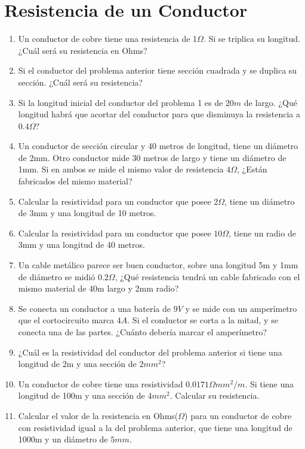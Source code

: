 \documentclass[../main]{subfiles}
\begin{document}
\chapter{Resistencia de un Conductor}


\begin{enumerate}
    \item Un conductor de cobre tiene una resistencia de 1$\Omega$. Si se triplica su longitud.  ¿Cuál será su resistencia en Ohms?
    \item Si el conductor del problema anterior tiene sección cuadrada y  se duplica su sección.  ¿Cuál será su resistencia?
    \item Si la longitud inicial del conductor del problema 1 es de $20m$ de largo.  ¿Qué longitud habrá que acortar del conductor para que disminuya la resistencia a $0.4\Omega$?
    \item Un conductor de sección circular y 40 metros de longitud, tiene un diámetro de 2mm. Otro conductor mide 30 metros de largo y tiene un diámetro de 1mm. Si en ambos se mide el mismo valor de resistencia $4\Omega$,  ¿Están fabricados del mismo material?   
    \item Calcular la resistividad para un conductor que posee $2\Omega$, tiene un diámetro de 3mm y una longitud de 10 metros.
    \item Calcular la resistividad para un conductor que posee $10\Omega$, tiene un radio de 3mm y una longitud de 40 metros.
    \item Un cable metálico parece ser buen conductor, sobre una longitud 5m y 1mm de diámetro se midió $0.2\Omega$,  ¿Qué resistencia tendrá un cable fabricado con el mismo material de 40m largo y 2mm radio?
    \item Se conecta un conductor a una batería de $9V$ y se mide con un amperímetro que el cortocircuito marca $4A$. Si el conductor se corta a la mitad, y se conecta una de las partes.  ¿Cuánto debería marcar el amperímetro?
    \item  ¿Cuál es la resistividad del conductor del problema anterior si tiene una longitud de 2m y una sección de $2mm^2$?
    \item Un conductor de cobre tiene una resistividad $0.0171 \Omega mm^2/m$. Si tiene una longitud de 100m y una sección de $4mm^2$. Calcular su resistencia.
    \item Calcular el valor de la resistencia en Ohms($\Omega$) para un conductor de cobre con resistividad igual a la del problema anterior, que tiene una longitud de 1000m y un diámetro de $5mm$.

\end{enumerate}
\end{document}
